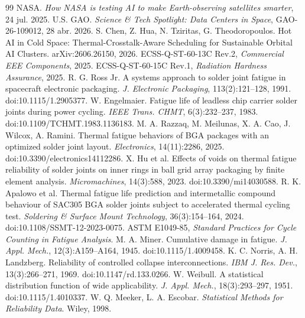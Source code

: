 \documentclass[12pt,a4paper]{article}
\begin{document}
\begin{thebibliography}{99}\small
 NASA. \emph{How NASA is testing AI to make Earth-observing satellites smarter}, 24 jul. 2025.
 U.S. GAO. \emph{Science \& Tech Spotlight: Data Centers in Space}, GAO-26-109012, 28 abr. 2026.
 S. Chen, Z. Hua, N. Tziritas, G. Theodoropoulos. Hot AI in Cold Space: Thermal-Crosstalk-Aware Scheduling for Sustainable Orbital AI Clusters. arXiv:2606.26150, 2026.
 ECSS-Q-ST-60-13C Rev.2, \emph{Commercial EEE Components}, 2025.
 ECSS-Q-ST-60-15C Rev.1, \emph{Radiation Hardness Assurance}, 2025.
 R. G. Ross Jr. A systems approach to solder joint fatigue in spacecraft electronic packaging. \emph{J. Electronic Packaging}, 113(2):121--128, 1991. doi:10.1115/1.2905377.
 W. Engelmaier. Fatigue life of leadless chip carrier solder joints during power cycling. \emph{IEEE Trans. CHMT}, 6(3):232--237, 1983. doi:10.1109/TCHMT.1983.1136183.
 M. A. Razzaq, M. Meilunas, X. A. Cao, J. Wilcox, A. Ramini. Thermal fatigue behaviors of BGA packages with an optimized solder joint layout. \emph{Electronics}, 14(11):2286, 2025. doi:10.3390/electronics14112286.
 X. Hu et al. Effects of voids on thermal fatigue reliability of solder joints on inner rings in ball grid array packaging by finite element analysis. \emph{Micromachines}, 14(3):588, 2023. doi:10.3390/mi14030588.
 R. K. Apalowo et al. Thermal fatigue life prediction and intermetallic compound behaviour of SAC305 BGA solder joints subject to accelerated thermal cycling test. \emph{Soldering \& Surface Mount Technology}, 36(3):154--164, 2024. doi:10.1108/SSMT-12-2023-0075.
 ASTM E1049-85, \emph{Standard Practices for Cycle Counting in Fatigue Analysis}.
 M. A. Miner. Cumulative damage in fatigue. \emph{J. Appl. Mech.}, 12(3):A159--A164, 1945. doi:10.1115/1.4009458.
 K. C. Norris, A. H. Landzberg. Reliability of controlled collapse interconnections. \emph{IBM J. Res. Dev.}, 13(3):266--271, 1969. doi:10.1147/rd.133.0266.
 W. Weibull. A statistical distribution function of wide applicability. \emph{J. Appl. Mech.}, 18(3):293--297, 1951. doi:10.1115/1.4010337.
 W. Q. Meeker, L. A. Escobar. \emph{Statistical Methods for Reliability Data}. Wiley, 1998.

\end{thebibliography}
\end{document}
